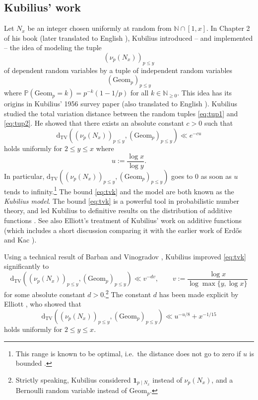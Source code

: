 \documentclass{article}
\theoremstyle{plain}
\theoremstyle{remark}
\newcommand{\PP}{\mathbb{P}}
\newcommand{\NN}{\mathbb{N}}
\newcommand{\dtv}{\mathrm{d}_{\mathrm{TV}}}
\newcommand{\Geom}{\mathrm{Geom}}
\numberwithin{equation}{section}
\begin{document}
\subsection{Kubilius' work}\label{sec:kub}
Let $N_x$ be an integer chosen uniformly at random from $\NN\cap [1,x]$. In Chapter 2 of his book \cite{Kubiliusbook1962} (later translated to English \cite{KubTranslate}),
Kubilius introduced -- and implemented -- the idea of modeling the tuple
\begin{equation}\label{eq:tup1}
(\nu_p(N_x))_{p\le y}
\end{equation}
of dependent random variables by a tuple of independent random variables
\begin{equation}\label{eq:tup2}
(\Geom_p)_{p\le y}
\end{equation}
where $\PP(\Geom_p=k)=p^{-k}(1-1/p)$ for all $k\in \NN_{\ge 0}$. This idea has its origins in Kubilius' 1956 survey paper \cite{Kubpaper} (also translated to English \cite{KubTranslatepaper}). Kubilius studied the total variation distance between the random tuples \eqref{eq:tup1} and \eqref{eq:tup2}. He showed that there exists an absolute constant $c>0$ such that  \cite[p.~27]{KubTranslate}
\begin{equation}\label{eq:tvk}
\dtv( (\nu_p(N_x))_{p\le y}, (\Geom_p)_{p\le y})\ll e^{-cu}
\end{equation}
holds uniformly for $2\le y \le x$ where
\[ u:=\frac{\log x}{\log y}.\]
In particular, $\dtv( (\nu_p(N_x))_{p\le y}, (\Geom_p)_{p\le y})$ goes to $0$ as soon as $u$ tends to infinity.\footnote{This range is known to be optimal, i.e.~the distance does not go to zero if $u$ is bounded  \cite[p.~145]{Elliott1}  \cite[Th\'{e}or\`{e}me 1]{TenenbaumCrible}.} The bound \eqref{eq:tvk} and the model are both known as the \textit{Kubilius model}. The bound  \eqref{eq:tvk}  is a powerful tool in probabilistic number theory, and led Kubilius to definitive results on the distribution of additive functions  \cite[Chapters IV, VI]{KubTranslate}. See also Elliott's treatment of Kubilius' work on additive functions \cite[Chapter 12]{Elliott2} (which includes a short discussion comparing it with the earlier work of Erd\H{o}s and Kac \cite[p.~26]{Elliott2}).

Using a technical result of Barban and Vinogradov \cite{BV}, Kubilius \cite[Equation~(10)]{Brownian} improved \eqref{eq:tvk} significantly to
\begin{equation}\label{eq:tvk2}
	\dtv( (\nu_p(N_x))_{p\le y}, (\Geom_p)_{p\le y})\ll v^{-dv},\qquad v:=\frac{\log x}{\log \max\{y,\log x\}}
\end{equation}
for some absolute constant $d>0$.\footnote{Strictly speaking, Kubilius considered $\mathbf{1}_{p\mid N_x}$ instead of $\nu_p(N_x)$, and a Bernoulli random variable instead of $\Geom_p$.} The constant $d$ has been made explicit by Elliott \cite[pp.~119--123]{Elliott1}, who showed that
\begin{equation}\label{eq:tvbv}
	\dtv( (\nu_p(N_x))_{p\le y}, (\Geom_p)_{p\le y})\ll u^{-u/8}+ x^{-1/15}
\end{equation}
holds uniformly for $2\le y \le x$.
\end{document}
